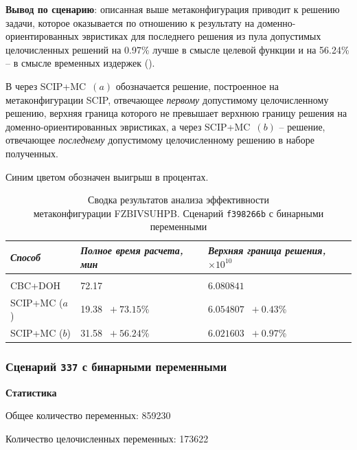 \documentclass[%
	11pt,
	a4paper,
	utf8,
		]{article}
\begin{document}
\vspace*{3mm}
\textbf{Вывод по сценарию}: описанная выше метаконфигурация приводит к решению задачи, которое оказывается по отношению к результату на доменно-ориентированных эвристиках для последнего решения из пула допустимых целочисленных решений на 0.97\% лучше в смысле целевой функции и на 56.24\% -- в смысле временных издержек ().

В   через SCIP+MC~$ (a) $ обозначается решение, построенное на метаконфигурации SCIP, отвечающее \emph{первому} допустимому целочисленному решению, верхняя граница которого не превышает верхнюю границу решения на доменно-ориентированных эвристиках, а через SCIP+MC~$ (b) $ -- решение, отвечающее \emph{последнему} допустимому целочисленному решению в наборе полученных.

Синим цветом обозначен выигрыш в процентах.

{
	\begin{table}[!h]
		\centering
		\caption{Сводка результатов анализа эффективности\\метаконфигурации FZBIVSUHPB. Сценарий \texttt{f398266b} с бинарными переменными}
		\begin{tabular}{ p{2.5cm} p{3.3cm} p{3.4cm} }
			\emph{Способ} & \emph{Полное время расчета, мин} & \emph{Верхняя граница решения, $ \times 10^{10} $} \\
			\hline\hline\\[-3.5mm]
			{CBC+DOH} & 72.17 & $ 6.080841 $ \\
			\hline
			SCIP+MC ($ a $) & 19.38 {\color{blue} $\ +73.15 $\%} & $ 6.054807 $ {\color{blue} $\ +0.43 $\%} \\
			\hline
			SCIP+MC ($ b $) & 31.58 {\color{blue} $\ +56.24 $\%} & $ 6.021603 $ {\color{blue} $\ +0.97 $\%} \\
		\end{tabular}\label{tab:f398266b}
	\end{table}
}

\subsubsection{Сценарий \texttt{337} с бинарными переменными}

\textbf{Статистика}\vspace*{1mm}

Общее количество переменных: 859230

Количество целочисленных переменных: 173622
\end{document}
